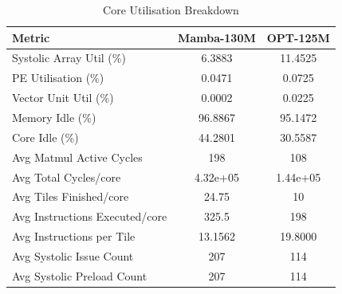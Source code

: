 \begin{table}[h]\centering
    \caption{Core Utilisation Breakdown}
    \label{tab:core_utilisation}
    \begin{tabular}{lcc}\hline
    Metric & Mamba-130M & OPT-125M \\\hline
        Systolic Array Util (\%) & 6.3883 & 11.4525 \\
    PE Utilisation (\%) & 0.0471 & 0.0725 \\
    Vector Unit Util (\%) & 0.0002 & 0.0225 \\
    Memory Idle (\%) & 96.8867 & 95.1472 \\
    Core Idle (\%) & 44.2801 & 30.5587 \\
    Avg Matmul Active Cycles & 198 & 108 \\
    Avg Total Cycles/core & 4.32e+05 & 1.44e+05 \\
    Avg Tiles Finished/core & 24.75 & 10 \\
    Avg Instructions Executed/core & 325.5 & 198 \\
    Avg Instructions per Tile & 13.1562 & 19.8000 \\
    Avg Systolic Issue Count & 207 & 114 \\
    Avg Systolic Preload Count & 207 & 114 \\
\hline\end{tabular}\end{table}